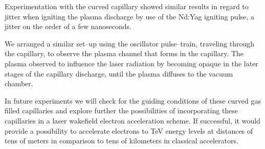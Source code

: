 \documentclass[../main.tex]{subfiles}
\begin{document}
Experimentation with the curved capillary showed similar results in regard to jitter when igniting the plasma discharge by use of the Nd:Yag igniting pulse, a jitter on the order of a few nanoseconds.

We arranged a similar set--up using the oscillator pulse--train, traveling through the capillary, to observe the plasma channel that forms in the capillary. The plasma observed to influence the laser radiation by becoming opaque in the later stages of the capillary discharge, until the plasma diffuses to the vacuum chamber.

In future experiments we will check for the guiding conditions of these curved gas filled capillaries and explore further the possibilities of incorporating these capillaries in a laser wakefield electron acceleration scheme. If successful, it would provide a possibility to accelerate electrons to \si{\tera\eV} energy levels at distances of tens of meters in comparison to tens of kilometers in classical accelerators.
\end{document}
